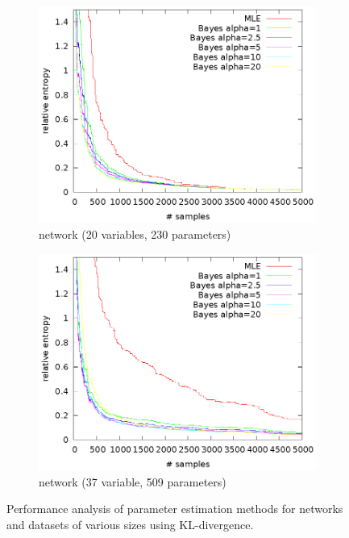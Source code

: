 \documentclass[english,cover]{fitthesis} %
\begin{document}
\begin{center}
\begin{figure}[h]
    \vspace{0.7cm}
    \begin{subfigure}[b]{0.55\linewidth}
        \hspace{-3.2cm}\includegraphics[scale=0.95]{fig/kl-child}
        \caption{ network (20 variables, 230 parameters)}
    \end{subfigure}
    \quad
    \begin{subfigure}[b]{0.55\linewidth}
        \hspace{-2.8cm}\includegraphics[scale=0.95]{fig/kl-icu}
        \caption{ network (37 variable, 509 parameters)}
    \end{subfigure}
    
    \caption{Performance analysis of parameter estimation methods for networks and datasets of various sizes using KL-divergence.}
    \label{fig:kl_div_benchmark}
\end{figure}
\end{center}
\end{document}
